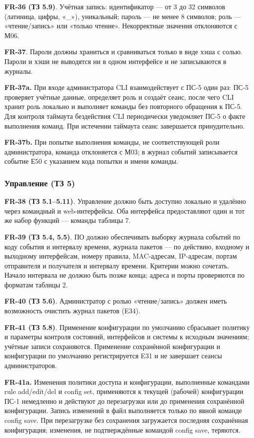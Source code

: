 \documentclass[13pt,a4paper,final]{article}
\begin{document}
	\textbf{FR-36 (ТЗ 5.9)}. Учётная запись: идентификатор — от 3 до 32 символов (латиница, цифры, «\_»), уникальный; пароль — не менее 8 символов; роль — «чтение/запись» или «только чтение». Некорректные значения отклоняются с М06.
	
	\textbf{FR-37}. Пароли должны храниться и сравниваться только в виде хэша с солью. Пароли и хэши не выводятся ни в одном интерфейсе и не записываются в журналы.
	
	\textbf{FR-37a.} При входе администратора CLI взаимодействует с ПС-5 один раз: ПС-5 проверяет учётные данные, определяет роль и создаёт сеанс, после чего CLI хранит роль локально и выполняет команды без повторного обращения к ПС-5. Для контроля таймаута бездействия CLI периодически уведомляет ПС-5 о факте выполнения команд. При истечении таймаута сеанс завершается принудительно.
	
	\textbf{FR-37b.} При попытке выполнения команды, не соответствующей роли администратора, команда отклоняется с М03; в журнал событий записывается событие Е50 с указанием кода попытки и имени команды.
	
	\subsubsection{Управление (ТЗ 5)}
	
	\textbf{FR-38 (ТЗ 5.1–5.11)}. Управление должно быть доступно локально и удалённо через командный и web-интерфейсы. Оба интерфейса предоставляют один и тот же набор функций — команды таблицы 7.
	
	\textbf{FR-39 (ТЗ 5.4, 5.5)}. ПО должно обеспечивать выборку журнала событий по коду события и интервалу времени, журнала пакетов — по действию, входному и выходному интерфейсам, номеру правила, MAC-адресам, IP-адресам, портам отправителя и получателя и интервалу времени. Критерии можно сочетать. Начало интервала не должно быть позже конца; адреса и порты проверяются по форматам таблицы 2.
	
	\textbf{FR-40 (ТЗ 5.6)}. Администратор с ролью «чтение/запись» должен иметь возможность очистить журнал пакетов (E34).
	
	\textbf{FR-41 (ТЗ 5.8)}. Применение конфигурации по умолчанию сбрасывает политику и параметры контроля состояний, интерфейсов и системы к исходным значениям; учётные записи сохраняются. Применение сохранённой конфигурации и конфигурации по умолчанию регистрируется E31 и не завершает сеансы администраторов.
	
	\textbf{FR-41a.} Изменения политики доступа и конфигурации, выполненные командами rule add/edit/del и config set, применяются к текущей (рабочей) конфигурации ПС-1 немедленно и действуют до перезагрузки или до применения сохранённой конфигурации. Запись изменений в файл выполняется только по явной команде config save. При перезагрузке без сохранения загружается последняя сохранённая конфигурация; изменения, не подтверждённые командой config save, теряются.
	
\end{document}
